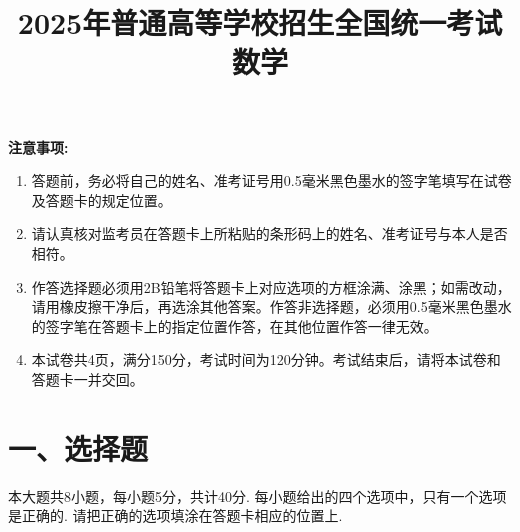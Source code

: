 \documentclass[UTF8]{ctexart}
\begin{document}
	\title{2025年普通高等学校招生全国统一考试 数学}
	\author{}
	\date{}
	\maketitle
	
	\begin{center}
		\begin{minipage}{\linewidth}
			\textbf{注意事项:}
			\begin{enumerate}
				\item 答题前，务必将自己的姓名、准考证号用0.5毫米黑色墨水的签字笔填写在试卷及答题卡的规定位置。
				\item 请认真核对监考员在答题卡上所粘贴的条形码上的姓名、准考证号与本人是否相符。
				\item 作答选择题必须用2B铅笔将答题卡上对应选项的方框涂满、涂黑；如需改动，请用橡皮擦干净后，再选涂其他答案。作答非选择题，必须用0.5毫米黑色墨水的签字笔在答题卡上的指定位置作答，在其他位置作答一律无效。
				\item 本试卷共4页，满分150分，考试时间为120分钟。考试结束后，请将本试卷和答题卡一并交回。
			\end{enumerate}
		\end{minipage}
	\end{center}
	
	\section*{一、选择题}
	本大题共8小题，每小题5分，共计40分. 每小题给出的四个选项中，只有一个选项是正确的. 请把正确的选项填涂在答题卡相应的位置上.
	
\end{document}
